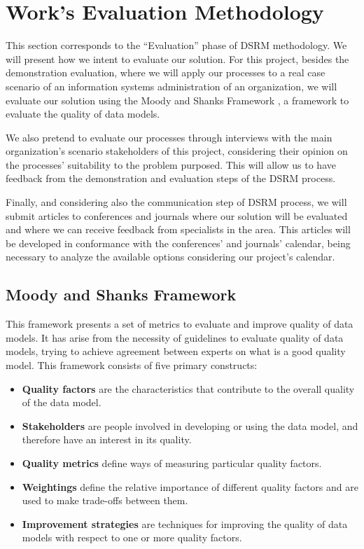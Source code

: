 
% 
% 

\section{Work's Evaluation Methodology}

This section corresponds to the ``Evaluation'' phase of DSRM methodology. We will present how we intent to evaluate our solution. For this project, besides the demonstration evaluation, where we will apply our processes to a real case scenario of an information systems administration of an organization, we will evaluate our solution using the Moody and Shanks Framework \cite{moody2003improving}, a framework to evaluate the quality of data models.\par
We also pretend to evaluate our processes through interviews with the main organization's scenario stakeholders of this project, considering their opinion on the processes' suitability to the problem purposed. This will allow us to have feedback from the demonstration and evaluation steps of the DSRM process.\par
Finally, and considering also the communication step of DSRM process, we will submit articles to conferences and journals where our solution will be evaluated and where we can receive feedback from specialists in the area. This articles will be developed in conformance with the conferences' and journals' calendar, being necessary to analyze the available options considering our project's calendar.\par

\subsection{Moody and Shanks Framework}

This framework presents a set of metrics to evaluate and improve quality of data models. It has arise from the necessity of guidelines to evaluate quality of data models, trying to achieve agreement between experts on what is a good quality model. This framework consists of five primary constructs:

\begin{itemize}
\item \textbf{Quality factors} are the characteristics that contribute to the overall quality of the data model.
\item \textbf{Stakeholders} are people involved in developing or using the data model, and therefore have an interest in its quality.
\item \textbf{Quality metrics} define ways of measuring particular quality factors.
\item \textbf{Weightings} define the relative importance of different quality factors and are used to make trade-offs between them.
\item \textbf{Improvement strategies} are techniques for improving the quality of data models with respect to one or more quality factors.
\end{itemize}

